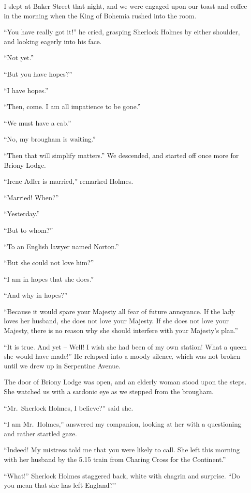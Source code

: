 
I slept at Baker Street that night, and we were engaged
upon our toast and coffee in the morning when the King of
Bohemia rushed into the room.

“You have really got it!” he cried, grasping Sherlock
Holmes by either shoulder, and looking eagerly into his face.

“Not yet.”

“But you have hopes?”

“I have hopes.”

“Then, come. I am all impatience to be gone.”

“We must have a cab.”

“No, my brougham is waiting.”

“Then that will simplify matters.” We descended, and
started off once more for Briony Lodge.

“Irene Adler is married,” remarked Holmes.

“Married! When?”

“Yesterday.”

“But to whom?”

“To an English lawyer named Norton.”

“But she could not love him?”

“I am in hopes that she does.”

“And why in hopes?”

“Because it would spare your Majesty all fear of future annoyance.
If the lady loves her husband, she does not love
your Majesty. If she does not love your Majesty, there is no
reason why she should interfere with your Majesty’s plan.”

“It is true. And yet -- Well! I wish she had been of
my own station! What a queen she would have made!” He
relapsed into a moody silence, which was not broken until we
drew up in Serpentine Avenue.

The door of Briony Lodge was open, and an elderly woman
stood upon the steps. She watched us with a sardonic eye
as we stepped from the brougham.

“Mr.~Sherlock Holmes, I believe?” said she.

“I am Mr.~Holmes,” answered my companion, looking at
her with a questioning and rather startled gaze.

“Indeed! My mistress told me that you were likely to call.
She left this morning with her husband by the 5.15 train from
Charing Cross for the Continent.”

“What!” Sherlock Holmes staggered back, white with
chagrin and surprise. “Do you mean that she has left
England?”

